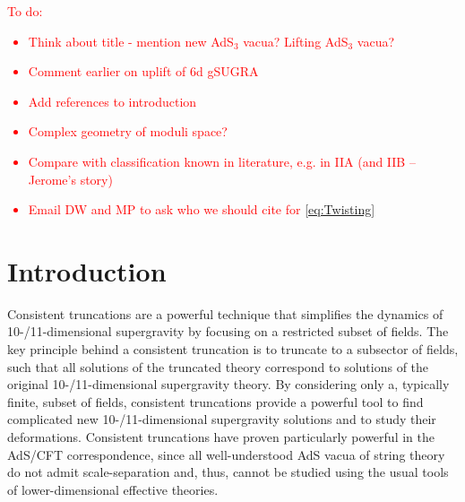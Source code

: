 \documentclass[a4paper, 11pt]{article}
\numberwithin{equation}{section}
\newcommand{\+}{\oplus}
\newcommand{\EM}[1]{\textcolor{red}{#1}}
\begin{document}
\tableofcontents
	
\newpage

\EM{To do:
\begin{itemize}
	\item Think about title - mention new AdS$_3$ vacua? Lifting AdS$_3$ vacua?
	\item Comment earlier on uplift of 6d gSUGRA
	\item Add references to introduction
	\item Complex geometry of moduli space?
	\item Compare with classification known in literature, e.g. in IIA (and IIB -- Jerome's story)
	\item Email DW and MP to ask who we should cite for \eqref{eq:Twisting}
\end{itemize}
}

\section{Introduction}
Consistent truncations are a powerful technique that simplifies the dynamics of 10-/11-dimensional supergravity by focusing on a restricted subset of fields. The key principle behind a consistent truncation is to truncate to a subsector of fields, such that all solutions of the truncated theory correspond to solutions of the original 10-/11-dimensional supergravity theory. By considering only a, typically finite, subset of fields, consistent truncations provide a powerful tool to find complicated new 10-/11-dimensional supergravity solutions and to study their deformations. Consistent truncations have proven particularly powerful in the AdS/CFT correspondence, since all well-understood AdS vacua of string theory do not admit scale-separation and, thus, cannot be studied using the usual tools of lower-dimensional effective theories.
\end{document}
